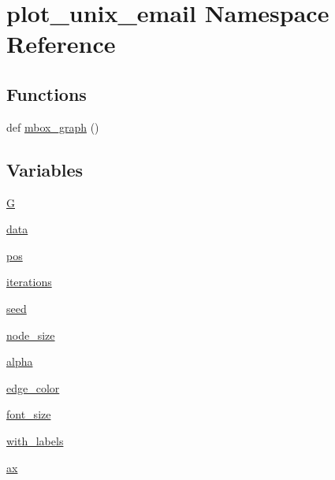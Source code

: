 \hypertarget{namespaceplot__unix__email}{}\section{plot\+\_\+unix\+\_\+email Namespace Reference}
\label{namespaceplot__unix__email}
\subsection*{Functions}
\begin{DoxyCompactItemize}
\item 
def \hyperlink{namespaceplot__unix__email_abb82e3bfc1f62ff0f0f72309b9fa8ccc}{mbox\+\_\+graph} ()
\end{DoxyCompactItemize}
\subsection*{Variables}
\begin{DoxyCompactItemize}
\item 
\hyperlink{namespaceplot__unix__email_acfb70aa012b761cfa038f25ac0ccc68a}{G}
\item 
\hyperlink{namespaceplot__unix__email_a307bf15c588928da2258f158bbee99f0}{data}
\item 
\hyperlink{namespaceplot__unix__email_a2e2b40d4a9df4eee8f83ac7b71d5bc2c}{pos}
\item 
\hyperlink{namespaceplot__unix__email_af7bd2a1354cc18f18d4820ed5f31a7fc}{iterations}
\item 
\hyperlink{namespaceplot__unix__email_a25c76bc7066fa8a1d33a8c48e3b615d2}{seed}
\item 
\hyperlink{namespaceplot__unix__email_a76d2eb965387ef5951d9bbe169ae2af7}{node\+\_\+size}
\item 
\hyperlink{namespaceplot__unix__email_ad6e13a9ac11888732ef7af3e6fe0a16d}{alpha}
\item 
\hyperlink{namespaceplot__unix__email_a5790727a73f41e8b3877810938ce9a3a}{edge\+\_\+color}
\item 
\hyperlink{namespaceplot__unix__email_aea54c87278ef0af639f2e8a0e83eb196}{font\+\_\+size}
\item 
\hyperlink{namespaceplot__unix__email_a4c25440f31b1176b7f486bcacadcd59c}{with\+\_\+labels}
\item 
\hyperlink{namespaceplot__unix__email_a64939c70a370255e84c1032a1f9c9005}{ax}
\end{DoxyCompactItemize}



